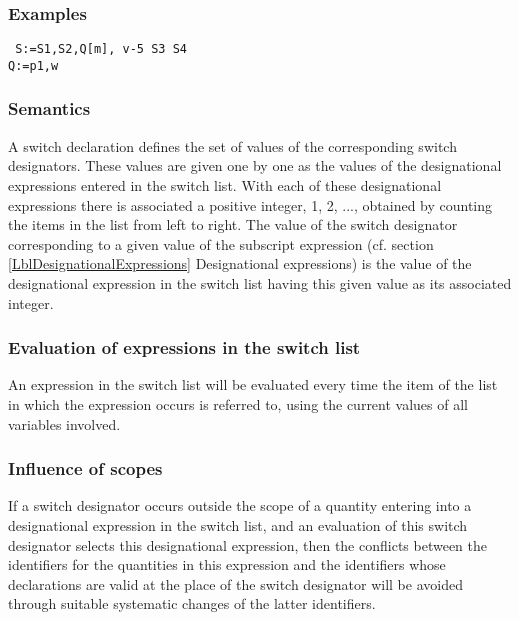 \documentclass[a4paper,11pt]{article}
\begin{document}
\subsubsection{Examples}

\begin{flushleft}
\texttt{ S:=S1,S2,Q[m],  v\mgt{}-5  S3  S4\\
 Q:=p1,w}\\
\end{flushleft}

\subsubsection{Semantics}
\label{LblSwitchDeclarationsSemantics}

A switch declaration defines the set of values of the corresponding
switch designators.  These values are given one by one as the values
of the designational expressions entered in the switch list.  With
each of these designational expressions there is associated a positive
integer, 1, 2, ..., obtained by counting the items in the list from
left to right.  The value of the switch designator corresponding to a
given value of the subscript expression (cf. section
\ref{LblDesignationalExpressions} Designational expressions) is the
value of the designational expression in the switch list having this
given value as its associated integer.

\subsubsection{Evaluation of expressions in the switch list}

An expression in the switch list will be evaluated every time the item
of the list in which the expression occurs is referred to, using the
current values of all variables involved.

\subsubsection{Influence of scopes}

If a switch designator occurs outside the scope of a quantity entering
into a designational expression in the switch list, and an evaluation
of this switch designator selects this designational expression, then
the conflicts between the identifiers for the quantities in this
expression and the identifiers whose declarations are valid at the
place of the switch designator will be avoided through suitable
systematic changes of the latter identifiers.
\end{document}
